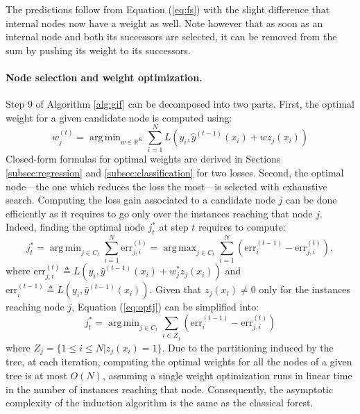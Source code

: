 \documentclass{article}
\DeclareMathOperator*{\argmin}{arg\,min}
\DeclareMathOperator*{\argmax}{arg\,max}
\begin{document}
The predictions follow from Equation (\ref{eq:fs}) with the slight difference
that internal nodes now have a weight as well. Note however that as soon as an
internal node and both its successors are selected, it can be removed from the
sum by pushing its weight to its successors.

\paragraph{Node selection and weight optimization.}
Step 9 of Algorithm \ref{alg:gif} can be decomposed into two parts. First,
the optimal weight for a given candidate node is computed using:
\begin{equation}\label{eq:nodeSel}
  w^{(t)}_j = \argmin_{w\in \mathbb{R}^K} \sum_{i=1}^N L\left(y_i, 
  \hat{y}^{(t-1)}(x_i) + w z_j(x_i)  \right)
\end{equation}
Closed-form formulas for optimal weights are derived in Sections
\ref{subsec:regression} and \ref{subsec:classification} for two losses. Second,
the optimal node---the one which reduces the loss the most---is selected with
exhaustive search. Computing the loss gain associated to a candidate node $j$
can be done efficiently as it requires to go only over the instances reaching
that node $j$. Indeed, finding the optimal node $j_t^*$ at step $t$ requires to 
compute:
\begin{equation}\label{eq:optj}
  j_t^* = \argmin_{j \in C_t} \sum_{i=1}^N \text{err}_{j,i}^{(t)} = \argmax_{j 
  \in C_t} 
  \sum_{i=1}^N (\text{err}^{(t-1)}_i - \text{err}_{j,i}^{(t)}),
\end{equation}
where $\text{err}_{j,i}^{(t)}\triangleq L(y_i,\hat{y}^{(t-1)}(x_i) + w_j^* z_j(x_i))$ and $\text{err}^{(t-1)}_i\triangleq L(y_i,\hat{y}^{(t-1)}(x_i))$.
Given that $z_j(x_i)\neq 0$ only for the instances reaching node $j$, Equation 
(\ref{eq:optj}) can be simplified into:
\begin{equation}\label{eq:optj2}
  j_t^* = \argmin_{j \in C_t} \sum_{i\in Z_j} (\text{err}^{(t-1)}_i - 
  \text{err}_{j,i}^{(t)})
\end{equation}
where $Z_j = \{1 \leq i \leq N | z_j (x_i)=1 \}$. Due to the partitioning
induced by the tree, at each iteration, computing the optimal
weights for all the nodes of a given tree is at most $O(N)$, assuming a single
weight optimization runs in linear time in the number of instances reaching
that node. Consequently, the asymptotic complexity of the induction algorithm 
is the same as the classical forest.
\end{document}
